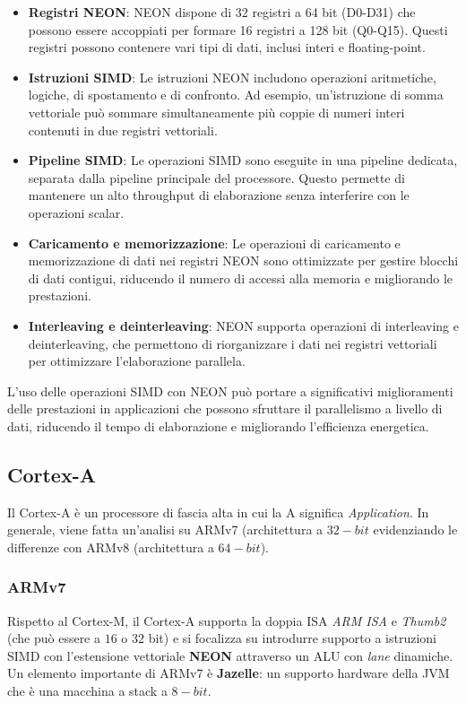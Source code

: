 \documentclass{article}
\begin{document}
\begin{itemize}
  \item \textbf{Registri NEON}: NEON dispone di 32 registri a 64 bit (D0-D31) che possono essere accoppiati per formare 16 registri a 128 bit (Q0-Q15). Questi registri possono contenere vari tipi di dati, inclusi interi e floating-point.
  \item \textbf{Istruzioni SIMD}: Le istruzioni NEON includono operazioni aritmetiche, logiche, di spostamento e di confronto. Ad esempio, un'istruzione di somma vettoriale può sommare simultaneamente più coppie di numeri interi contenuti in due registri vettoriali.
  \item \textbf{Pipeline SIMD}: Le operazioni SIMD sono eseguite in una pipeline dedicata, separata dalla pipeline principale del processore. Questo permette di mantenere un alto throughput di elaborazione senza interferire con le operazioni scalar.
  \item \textbf{Caricamento e memorizzazione}: Le operazioni di caricamento e memorizzazione di dati nei registri NEON sono ottimizzate per gestire blocchi di dati contigui, riducendo il numero di accessi alla memoria e migliorando le prestazioni.
  \item \textbf{Interleaving e deinterleaving}: NEON supporta operazioni di interleaving e deinterleaving, che permettono di riorganizzare i dati nei registri vettoriali per ottimizzare l'elaborazione parallela.
\end{itemize}

L'uso delle operazioni SIMD con NEON può portare a significativi miglioramenti delle prestazioni in applicazioni che possono sfruttare il parallelismo a livello di dati, riducendo il tempo di elaborazione e migliorando l'efficienza energetica.

\clearpage
\subsection{Cortex-A}
Il Cortex-A è un processore di fascia alta in cui la A significa \textit{Application}. In generale, viene fatta un'analisi su ARMv7 (architettura a $32-bit$ evidenziando le differenze con ARMv8 (architettura a $64-bit$). 

\subsubsection{ARMv7}
Rispetto al Cortex-M, il Cortex-A supporta la doppia ISA \textit{ARM ISA} e \textit{Thumb2} (che può essere a $16$ o $32$ bit) e si focalizza su introdurre supporto a istruzioni SIMD con l'estensione vettoriale \textbf{NEON} attraverso un ALU con \textit{lane} dinamiche. 
Un elemento importante di ARMv7 è \textbf{Jazelle}: un supporto hardware della JVM che è una macchina a stack a $8-bit$. 
\end{document}
